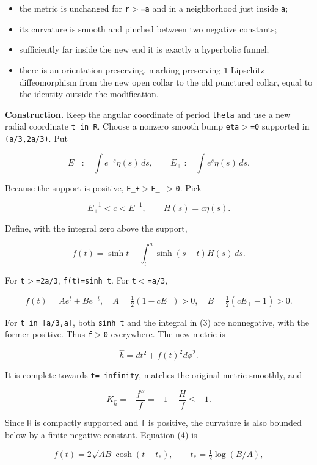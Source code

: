 \documentclass[11pt]{article}
\providecommand{\tightlist}{\setlength{\itemsep}{1pt}\setlength{\parskip}{0pt}}
\renewcommand{\textgreater}{\ensuremath{>}}
\renewcommand{\textless}{\ensuremath{<}}
\begin{document}
\begin{itemize}
\tightlist
\item
  the metric is unchanged for \texttt{r\textgreater{}=a} and in a
  neighborhood just inside \texttt{a};
\item
  its curvature is smooth and pinched between two negative constants;
\item
  sufficiently far inside the new end it is exactly a hyperbolic funnel;
\item
  there is an orientation-preserving, marking-preserving
  \texttt{1}-Lipschitz diffeomorphism from the new open collar to the
  old punctured collar, equal to the identity outside the modification.
\end{itemize}

\textbf{Construction.} Keep the angular coordinate of period
\texttt{theta} and use a new radial coordinate \texttt{t\ in\ R}. Choose
a nonzero smooth bump \texttt{eta\textgreater{}=0} supported in
\texttt{(a/3,2a/3)}. Put

\[
E_-:=\int e^{-s}\eta(s)\,ds,
\qquad E_+:=\int e^s\eta(s)\,ds.
\]

Because the support is positive,
\texttt{E\_\allowbreak +\textgreater{}E\_\allowbreak -\textgreater{}0}. Pick

\[
E_+^{-1}<c<E_-^{-1},\qquad H(s)=c\eta(s).
\]

Define, with the integral zero above the support,

\[
f(t)=\sinh t+\int_t^a\sinh(s-t)H(s)\,ds.
\tag{3}
\]

For \texttt{t\textgreater{}=2a/3}, \texttt{f(t)=sinh\ t}. For
\texttt{t\textless{}=a/3},

\[
f(t)=A e^t+B e^{-t},\quad
A=\tfrac12(1-cE_-)>0,\quad
B=\tfrac12(cE_+-1)>0.
\tag{4}
\]

For \texttt{t\ in\ {[}a/3,a{]}}, both \texttt{sinh\ t} and the integral
in (3) are nonnegative, with the former positive. Thus
\texttt{f\textgreater{}0} everywhere. The new metric is

\[
\widehat h=dt^2+f(t)^2d\phi^2.
\]

It is complete towards \texttt{t=-infinity}, matches the original metric
smoothly, and

\[
K_{\widehat h}=-\frac{f''}{f}=-1-\frac{H}{f}\le-1.
\tag{5}
\]

Since \texttt{H} is compactly supported and \texttt{f} is positive, the
curvature is also bounded below by a finite negative constant. Equation
(4) is

\[
f(t)=2\sqrt{AB}\cosh(t-t_*),
\qquad t_* =\tfrac12\log(B/A),
\]
\end{document}
